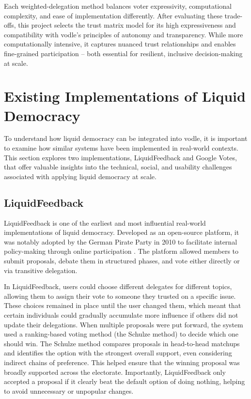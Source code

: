 Each weighted-delegation method balances voter expressivity, computational complexity, and ease of implementation differently. After evaluating these trade-offs, this project selects the trust matrix model for its high expressiveness and compatibility with vodle's principles of autonomy and transparency. While more computationally intensive, it captures nuanced trust relationships and enables fine-grained participation -- both essential for resilient, inclusive decision-making at scale.

\section{Existing Implementations of Liquid Democracy}
To understand how liquid democracy can be integrated into vodle, it is important to examine how similar systems have been implemented in real-world contexts. 
This section explores two implementations, LiquidFeedback and Google Votes, that offer valuable insights into the technical, social, and usability challenges associated with applying liquid democracy at scale.
\subsection{LiquidFeedback}
LiquidFeedback is one of the earliest and most influential real-world implementations of liquid democracy. Developed as an open-source platform, it was notably adopted by the German Pirate Party in 2010 to facilitate internal policy-making through online participation \citep{behrens_liquidfeedback_2014}. The platform allowed members to submit proposals, debate them in structured phases, and vote either directly or via transitive delegation.

In LiquidFeedback, users could choose different delegates for different topics, allowing them to assign their vote to someone they trusted on a specific issue. These choices remained in place until the user changed them, which meant that certain individuals could gradually accumulate more influence if others did not update their delegations. When multiple proposals were put forward, the system used a ranking-based voting method (the Schulze method) to decide which one should win. The Schulze method compares proposals in head-to-head matchups and identifies the option with the strongest overall support, even considering indirect chains of preference. This helped ensure that the winning proposal was broadly supported across the electorate. Importantly, LiquidFeedback only accepted a proposal if it clearly beat the default option of doing nothing, helping to avoid unnecessary or unpopular changes.


